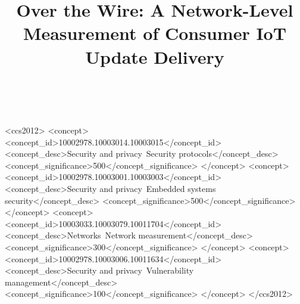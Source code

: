 \documentclass[sigconf,natbib=false,balance=false]{acmart}
\begin{document}
\title{Over the Wire: A Network-Level Measurement of Consumer IoT Update Delivery}
\renewcommand{\shorttitle}{Over the Wire: IoT Update Delivery}

%
%
%

\author{\textcolor{white}{.}}
\affiliation[obeypunctuation=true]{%
  \institution{\textcolor{white}{.}}
  \city{\textcolor{white}{.}}
  \country{\textcolor{white}{.}}}



\begin{CCSXML}
<ccs2012>
   <concept>
       <concept_id>10002978.10003014.10003015</concept_id>
       <concept_desc>Security and privacy~Security protocols</concept_desc>
       <concept_significance>500</concept_significance>
       </concept>
   <concept>
       <concept_id>10002978.10003001.10003003</concept_id>
       <concept_desc>Security and privacy~Embedded systems security</concept_desc>
       <concept_significance>500</concept_significance>
       </concept>
   <concept>
       <concept_id>10003033.10003079.10011704</concept_id>
       <concept_desc>Networks~Network measurement</concept_desc>
       <concept_significance>300</concept_significance>
       </concept>
   <concept>
       <concept_id>10002978.10003006.10011634</concept_id>
       <concept_desc>Security and privacy~Vulnerability management</concept_desc>
       <concept_significance>100</concept_significance>
       </concept>
 </ccs2012>
\end{CCSXML}
\end{document}
